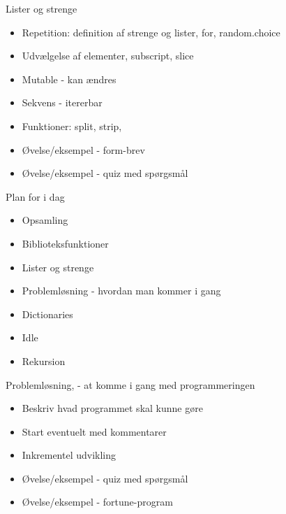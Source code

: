 \documentclass[a4paper,landscape]{slides}
\begin{document}
\begin{slide}
	\begin{center} {\large 
            Lister og strenge
	} \end{center}
	\begin{itemize} \addtolength{\itemsep}{-\baselineskip}
                \item Repetition: definition af strenge og lister, for, random.choice
                \item Udvælgelse af elementer, subscript, slice
                \item Mutable - kan ændres
		\item Sekvens - itererbar
                \item Funktioner: split, strip, 
                \item Øvelse/eksempel - form-brev
                \item Øvelse/eksempel - quiz med spørgsmål
	\end{itemize}
\end{slide}

\begin{slide}
	\begin{center} {\large 
            Plan for i dag
	} \end{center}
	\begin{itemize} \addtolength{\itemsep}{-\baselineskip}
		\item Opsamling
		\item Biblioteksfunktioner
                \item Lister og strenge
		\item Problemløsning - hvordan man kommer i gang
                \item Dictionaries
		\item Idle
		\item Rekursion
	\end{itemize}
\end{slide}


\begin{slide}
	\begin{center} {\large 
            Problemløsning, - at komme i gang med programmeringen
	} \end{center}
	\begin{itemize} \addtolength{\itemsep}{-\baselineskip}
		\item Beskriv hvad programmet skal kunne gøre
		\item Start eventuelt med kommentarer
                \item Inkrementel udvikling
                \item Øvelse/eksempel - quiz med spørgsmål
                \item Øvelse/eksempel - fortune-program
	\end{itemize}
\end{slide}
\end{document}
